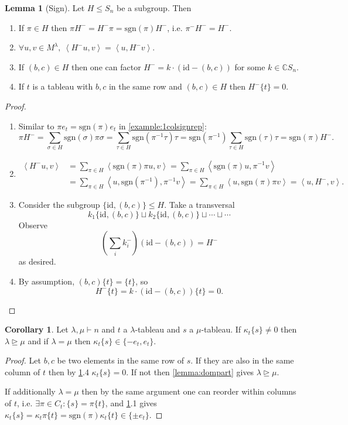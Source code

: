 \documentclass{article}
\newcommand{\sgn}{\text{sgn}}
\newcommand{\la}{\left\langle}
\newcommand{\ra}{\right\rangle}
\newcommand{\C}{\mathbb{C}}
\newcommand{\id}{\text{id}}
\theoremstyle{definition}
\newtheorem{lemma}[defn]{Lemma}
\newtheorem{coro}[defn]{Corollary}
\begin{document}
\begin{lemma}[Sign]
\label{lemma:sign}
Let $H\leq S_n$ be a subgroup. Then
\begin{enumerate}
\item If $\pi\in H$ then $\pi H^-=H^-\pi=\sgn(\pi)H^-$, i.e. $\pi^-H^-=H^-$.
\item $\forall u,v\in M^\lambda,\ \la H^-u,v\ra=\la u,H^-v\ra$.
\item If $(b,c)\in H$ then one can factor $H^-=k\cdot (\id-(b,c))$ for some $k\in\C S_n$.
\item If $t$ is a tableau with $b,c$ in the same row and $(b,c)\in H$ then $H^-\{t\}=0$.
\end{enumerate}
\end{lemma}
\begin{proof}
\begin{enumerate}
\item Similar to $\pi e_t=\sgn(\pi)e_t$ in \ref{example:1colsignrep}:
\[
\pi H^-=\sum_{\sigma\in H}\sgn(\sigma)\pi\sigma=\sum_{\tau\in H}\sgn(\pi^{-1}\tau)\tau=\sgn(\pi^{-1})\sum_{\tau\in H} \sgn(\tau)\tau=\sgn(\pi)H^-.
\]
\item \[
\begin{aligned}
\la H^-u,v \ra&=\sum_{\pi\in H}\la \sgn(\pi)\pi u,v \ra=\sum_{\pi\in H}\la\sgn(\pi)u,\pi^{-1}v\ra\\
&=\sum_{\pi\in H}\la u,\sgn(\pi^{-1}),\pi^{-1}v\ra=\sum_{\pi\in H}\la u,\sgn(\pi)\pi v\ra=\la u,H^-,v\ra.
\end{aligned}
\]
\item Consider the subgroup $\{\id,(b,c)\}\leq H$. Take a transversal
\[
k_1\{\id,(b,c)\}\sqcup k_2\{\id,(b,c)\}\sqcup\cdots\sqcup\cdots
\]
Observe
\[
\left(\sum_i k_i^-\right)(\id-(b,c))=H^-
\]
as desired.
\item By assumption, $(b,c)\{t\}=\{t\}$, so
\[
H^-\{t\}=k\cdot(\id-(b,c))\{t\}=0.
\]
\end{enumerate}
\end{proof}

\begin{coro}
\label{coro:non0kappameansdominance}
Let $\lambda,\mu\vdash n$ and $t$ a $\lambda$-tableau and $s$ a $\mu$-tableau. If $\kappa_t\{s\}\neq 0$ then $\lambda\unrhd\mu$ and if $\lambda=\mu$ then $\kappa_t\{s\}\in\{-e_t,e_t\}$.
\end{coro}
\begin{proof}
Let $b,c$ be two elements in the same row of $s$. If they are also in the same column of $t$ then by \ref{lemma:sign}.4 $\kappa_t\{s\}=0$. If not then \ref{lemma:dompart} gives $\lambda\unrhd\mu$.

If additionally $\lambda=\mu$ then by the same argument one can reorder within columns of $t$, i.e. $\exists\pi\in C_t: \{s\}=\pi\{t\}$, and \ref{lemma:sign}.1 gives $\kappa_t\{s\}=\kappa_t\pi\{t\}=\sgn(\pi)\kappa_t\{t\}\in\{\pm e_t\}$.
\end{proof}
\end{document}
